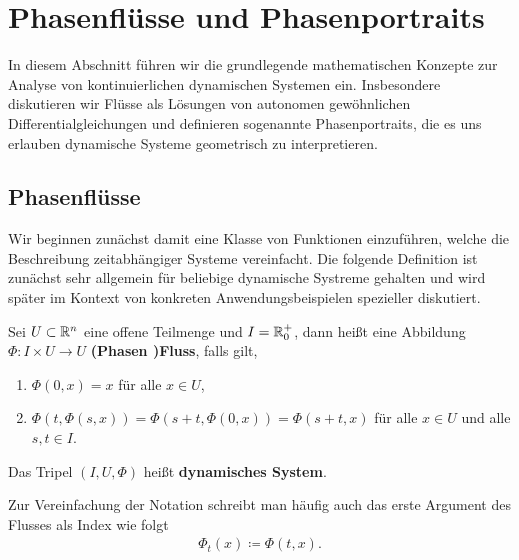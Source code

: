 \section{Phasenflüsse und Phasenportraits}
\label{\detokenize{ode/fluesse:phasenflusse-und-phasenportraits}}\label{\detokenize{ode/fluesse:s-fluesse}}\label{\detokenize{ode/fluesse::doc}}
\par
In diesem Abschnitt führen wir die grundlegende mathematischen Konzepte zur Analyse von kontinuierlichen dynamischen Systemen ein. Insbesondere diskutieren wir Flüsse als Lösungen von autonomen gewöhnlichen Differentialgleichungen und definieren sogenannte Phasenportraits, die es uns erlauben dynamische Systeme geometrisch zu interpretieren.


\subsection{Phasenflüsse}
\label{\detokenize{ode/fluesse:phasenflusse}}
\par
Wir beginnen zunächst damit eine Klasse von Funktionen einzuführen, welche die Beschreibung zeitabhängiger Systeme vereinfacht.
Die folgende Definition ist zunächst sehr allgemein für beliebige dynamische Systreme gehalten und wird später im Kontext von konkreten Anwendungsbeispielen spezieller diskutiert.
\label{ode/fluesse:def:Fluss}
\begin{definition}{}{}



\par
Sei \(U \subset \mathbb{R}^n\) eine offene Teilmenge und \(I=\mathbb{R}^+_0\), dann heißt eine Abbildung \(\Phi:I\times U\rightarrow U\) \textbf{(Phasen )Fluss}, falls gilt,
\begin{enumerate}

\item {} 
\par
\(\Phi(0, x) = x\) für alle \(x\in U\),

\item {} 
\par
\(\Phi(t, \Phi(s,x)) = \Phi(s + t, \Phi(0, x)) = \Phi(s + t, x)\) für alle \(x\in U\) und alle \(s,t\in I\).

\end{enumerate}

\par
Das Tripel \((I, U, \Phi)\) heißt \textbf{dynamisches System}.

\par
Zur Vereinfachung der Notation schreibt man häufig auch das erste Argument des Flusses als Index wie folgt
\begin{align*}
\Phi_t(x) \coloneqq \Phi(t, x).
\end{align*}\end{definition}

